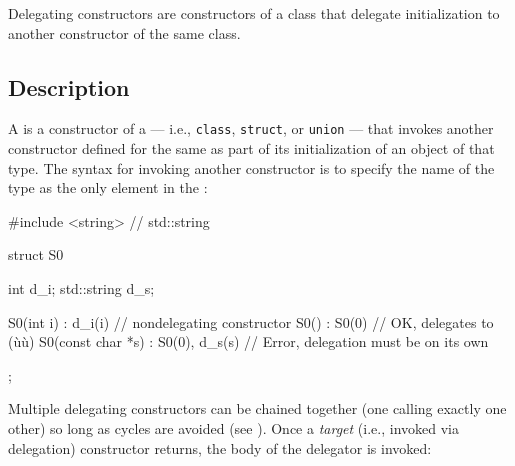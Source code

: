 

\setcounter{table}{0}
\setcounter{footnote}{0}
\setcounter{lstlisting}{0}

Delegating constructors are constructors of a class that delegate initialization to another
constructor of the same class.

\subsection[Description]{Description}\label{description}

A  is a constructor of a
 --- i.e., \lstinline!class!, \lstinline!struct!, or
\lstinline!union! --- that invokes another constructor defined for the same
 as part of its initialization of an object of that type.
The syntax for invoking another constructor is to specify
the name of the type as the only element in the :

%
\begin{emcppslisting}
#include <string>  // std::string

struct S0
{
  int         d_i;
  std::string d_s;

  S0(int i)         : d_i(i)        {} // nondelegating constructor
  S0()              : S0(0)         {} // OK, delegates to (ù{}ù)
  S0(const char *s) : S0(0), d_s(s) {} // Error, delegation must be on its own
};  
\end{emcppslisting}
    
\noindent Multiple delegating constructors can be chained together (one calling
exactly one other) so long as cycles are avoided (see ).
Once a \emph{target} (i.e., invoked via delegation) constructor returns,
the body of the delegator is invoked:

